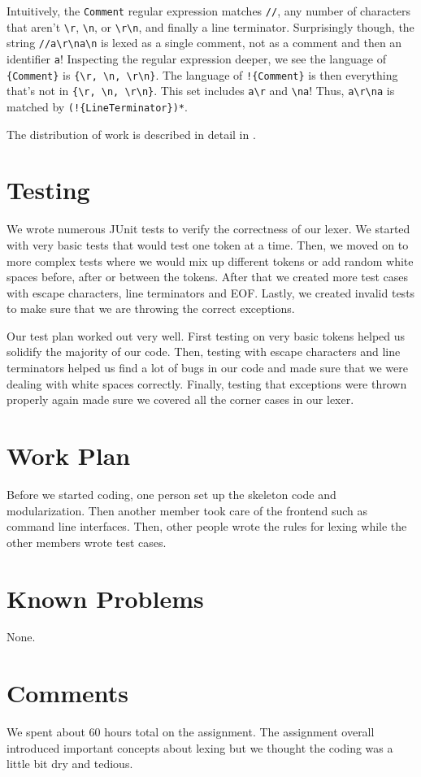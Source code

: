 \documentclass{hw}
\begin{document}
Intuitively, the \texttt{Comment} regular expression matches \texttt{//}, any
number of characters that aren't \verb$\r$, \verb$\n$, or \verb$\r\n$, and
finally a line terminator. Surprisingly though, the string \verb$//a\r\na\n$ is
lexed as a single comment, not as a comment and then an identifier \verb$a$!
Inspecting the regular expression deeper, we see the language of
\verb${Comment}$ is \verb${\r, \n, \r\n}$. The language of \verb$!{Comment}$ is
then everything that's not in \verb${\r, \n, \r\n}$. This set includes
\verb$a\r$ and \verb$\na$! Thus, \verb$a\r\na$ is matched by
\verb$(!{LineTerminator})*$.

The distribution of work is described in detail in .

\section{Testing}\label{sec:testing}
We wrote numerous JUnit tests to verify the correctness of our lexer. We
started with very basic tests that would test one token at a time. Then, we
moved on to more complex tests where we would mix up different tokens or add
random white spaces before, after or between the tokens. After that we created
more test cases with escape characters, line terminators and EOF. Lastly, we
created invalid tests to make sure that we are throwing the correct exceptions.

Our test plan worked out very well. First testing on very basic tokens helped
us solidify the majority of our code. Then, testing with escape characters and
line terminators helped us find a lot of bugs in our code and made sure that we
were dealing with white spaces correctly.  Finally, testing that exceptions
were thrown properly again made sure we covered all the corner cases in our
lexer.

\section{Work Plan}\label{sec:workplan}
Before we started coding, one person set up the skeleton code and
modularization. Then another member took care of the frontend such as command
line interfaces. Then, other people wrote the rules for lexing while the other
members wrote test cases.

\section{Known Problems}\label{sec:problems}
None.

\section{Comments}\label{sec:comments}
We spent about 60 hours total on the assignment. The assignment overall
introduced important concepts about lexing but we thought the coding was a
little bit dry and tedious.
\end{document}

